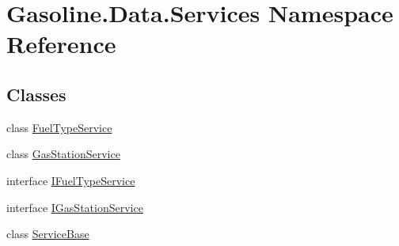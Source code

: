\hypertarget{namespace_gasoline_1_1_data_1_1_services}{}\section{Gasoline.\+Data.\+Services Namespace Reference}
\label{namespace_gasoline_1_1_data_1_1_services}
\subsection*{Classes}
\begin{DoxyCompactItemize}
\item 
class \mbox{\hyperlink{class_gasoline_1_1_data_1_1_services_1_1_fuel_type_service}{Fuel\+Type\+Service}}
\item 
class \mbox{\hyperlink{class_gasoline_1_1_data_1_1_services_1_1_gas_station_service}{Gas\+Station\+Service}}
\item 
interface \mbox{\hyperlink{interface_gasoline_1_1_data_1_1_services_1_1_i_fuel_type_service}{I\+Fuel\+Type\+Service}}
\item 
interface \mbox{\hyperlink{interface_gasoline_1_1_data_1_1_services_1_1_i_gas_station_service}{I\+Gas\+Station\+Service}}
\item 
class \mbox{\hyperlink{class_gasoline_1_1_data_1_1_services_1_1_service_base}{Service\+Base}}
\end{DoxyCompactItemize}
